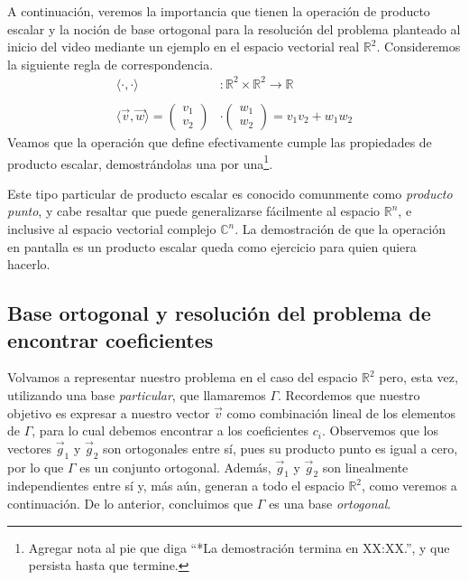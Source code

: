 \documentclass[12pt,dvipsnames]{article}
\numberwithin{equation}{section}
\begin{document}
A continuación, veremos la importancia que tienen la operación de producto escalar y la noción de base ortogonal para la resolución del problema planteado al inicio del video mediante un ejemplo en el espacio vectorial real $\mathbb{R}^2$. Consideremos la siguiente regla de correspondencia.
\begin{align*}
    \langle \cdot , \cdot \rangle&: \mathbb{R}^2\times\mathbb{R}^2\to \mathbb{R} \\ \\
    \langle \vec{v} , \vec{w} \rangle = \begin{pmatrix} v_1 \\ v_2 \end{pmatrix} &\cdot \begin{pmatrix} w_1 \\ w_2 \end{pmatrix} = v_1v_2 + w_1w_2
\end{align*}
\noindent Veamos que la operación que define efectivamente cumple las propiedades de producto escalar, demostrándolas una por una\footnote{Agregar nota al pie que diga ``*La demostración termina en XX:XX.'', y que persista hasta que termine.}.

Este tipo particular de producto escalar es conocido comunmente como \emph{producto punto}, y cabe resaltar que puede generalizarse fácilmente al espacio $\mathbb{R}^n$, e inclusive al espacio vectorial complejo $\mathbb{C}^n$. La demostración de que la operación en pantalla es un producto escalar queda como ejercicio para quien quiera hacerlo.


\subsection{Base ortogonal y resolución del problema de encontrar coeficientes}

Volvamos a representar nuestro problema en el caso del espacio $\mathbb{R}^2$ pero, esta vez, utilizando una base \emph{particular}, que llamaremos $\Gamma$. Recordemos que nuestro objetivo es expresar a nuestro vector $\vec{v}$ como combinación lineal de los elementos de $\Gamma$, para lo cual debemos encontrar a los coeficientes $c_i$. Observemos que los vectores $\vec{g}_1$ y $\vec{g}_2$ son ortogonales entre sí, pues su producto punto es igual a cero, por lo que $\Gamma$ es un conjunto ortogonal. Además, $\vec{g}_1$ y $\vec{g}_2$ son linealmente independientes entre sí y, más aún, generan a todo el espacio $\mathbb{R}^2$, como veremos a continuación. De lo anterior, concluimos que $\Gamma$ es una base \emph{ortogonal}.
\end{document}
